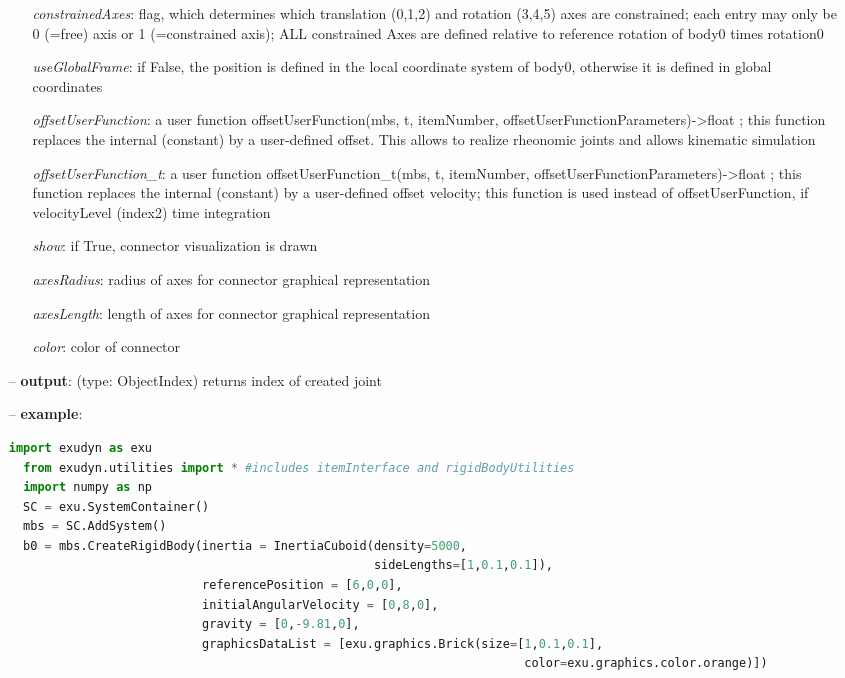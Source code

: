 \begin{itemize}[leftmargin=0.7cm]
\begin{itemize}[leftmargin=1.2cm]
\item[]{\it constrainedAxes}: flag, which determines which translation (0,1,2) and rotation (3,4,5) axes are constrained; each entry may only be 0 (=free) axis or 1 (=constrained axis); ALL constrained Axes are defined relative to reference rotation of body0 times rotation0
\item[]{\it useGlobalFrame}: if False, the position is defined in the local coordinate system of body0, otherwise it is defined in global coordinates
\item[]{\it offsetUserFunction}: a user function offsetUserFunction(mbs, t, itemNumber, offsetUserFunctionParameters)->float ; this function replaces the internal (constant) by a user-defined offset. This allows to realize rheonomic joints and allows kinematic simulation
\item[]{\it offsetUserFunction\_t}: a user function offsetUserFunction\_t(mbs, t, itemNumber, offsetUserFunctionParameters)->float ; this function replaces the internal (constant) by a user-defined offset velocity; this function is used instead of offsetUserFunction, if velocityLevel (index2) time integration
\item[]{\it show}: if True, connector visualization is drawn
\item[]{\it axesRadius}: radius of axes for connector graphical representation
\item[]{\it axesLength}: length of axes for connector graphical representation
\item[]{\it color}: color of connector
\end{itemize}
\item[--]
{\bf output}: (type: ObjectIndex) returns index of created joint
\item[--]
{\bf example}: \vspace{-12pt}\ei\begin{lstlisting}[language=Python, xleftmargin=36pt]
  import exudyn as exu
  from exudyn.utilities import * #includes itemInterface and rigidBodyUtilities
  import numpy as np
  SC = exu.SystemContainer()
  mbs = SC.AddSystem()
  b0 = mbs.CreateRigidBody(inertia = InertiaCuboid(density=5000,
                                                   sideLengths=[1,0.1,0.1]),
                           referencePosition = [6,0,0],
                           initialAngularVelocity = [0,8,0],
                           gravity = [0,-9.81,0],
                           graphicsDataList = [exu.graphics.Brick(size=[1,0.1,0.1],
                                                                        color=exu.graphics.color.orange)])

\end{lstlisting}
\end{itemize}
